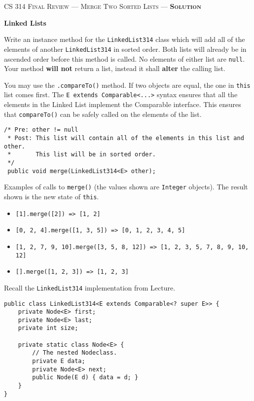 \documentclass[12pt,letter]{article}
\begin{document}
\noindent\textsc{\large CS 314 Final Review --- Merge Two Sorted Lists --- \textbf{Solution}}

\vspace{6pt}
\noindent\textbf{Linked Lists}

\vspace{2pt}
\noindent Write an instance method for the \texttt{LinkedList314} class which will add all of the elements of another \texttt{LinkedList314} in sorted order.
Both lists will already be in ascended order before this method is called. No elements of either list are \texttt{null}. 
Your method \textbf{will not} return a list, instead it shall \textbf{alter} the calling list.

\vspace{4pt}
\noindent You may use the \texttt{.compareTo()} method. If two objects are equal, the one in \texttt{this} list comes first.
The \texttt{E extends Comparable<...>} syntax ensures that all the elements in the Linked List implement the Comparable interface.
This ensures that \texttt{compareTo()} can be safely called on the elements of the list.

\begin{verbatim}
/* Pre: other != null
 * Post: This list will contain all of the elements in this list and other.
 *       This list will be in sorted order.
 */
 public void merge(LinkedList314<E> other);
\end{verbatim}

\noindent Examples of calls to \texttt{merge()} (the values shown are \texttt{Integer} objects). The result shown is the new state of \texttt{this}.
\begin{itemize}
  \item \texttt{[1].merge([2]) => [1, 2]}
  \item \texttt{[0, 2, 4].merge([1, 3, 5]) => [0, 1, 2, 3, 4, 5]}
  \item \begin{verbatim}[1, 2, 7, 9, 10].merge([3, 5, 8, 12]) => [1, 2, 3, 5, 7, 8, 9, 10, 12] \end{verbatim}
  \item \texttt{[].merge([1, 2, 3]) => [1, 2, 3]}
\end{itemize}

\vspace{6pt}
\noindent Recall the \texttt{LinkedList314} implementation from Lecture.
\begin{verbatim}
public class LinkedList314<E extends Comparable<? super E>> {
    private Node<E> first;
    private Node<E> last;
    private int size;

    private static class Node<E> {
        // The nested Nodeclass.
        private E data;
        private Node<E> next;
        public Node(E d) { data = d; }
    }
}
\end{verbatim}
\end{document}
